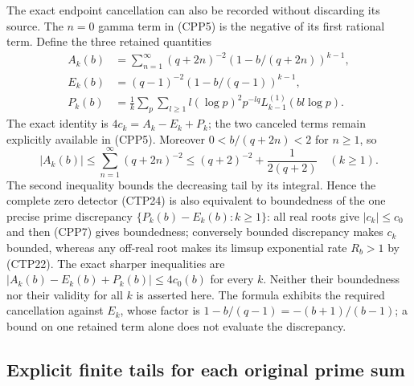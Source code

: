 The exact endpoint cancellation can also be recorded without
discarding its source. The $n=0$ gamma term in (CPP5) is the
negative of its first rational term. Define the three retained
quantities
\begin{equation}\tag{CPP6}
\begin{split}
 A_k(b)&=\sum_{n=1}^\infty(q+2n)^{-2}
                          (1-b/(q+2n))^{k-1},\\
 E_k(b)&=(q-1)^{-2}(1-b/(q-1))^{k-1},\\
 P_k(b)&=\frac1k\sum_p\sum_{l\ge1}
       l(\log p)^2p^{-lq}L_{k-1}^{(1)}(bl\log p).
\end{split}
\end{equation}
The exact identity is $4c_k=A_k-E_k+P_k$; the two canceled
terms remain explicitly available in (CPP5). Moreover
$0<b/(q+2n)<2$ for $n\ge1$, so
\begin{equation}\tag{CPP7}
 |A_k(b)|\le\sum_{n=1}^\infty(q+2n)^{-2}
     \le(q+2)^{-2}+\frac1{2(q+2)}\quad(k\ge1).
\end{equation}
The second inequality bounds the decreasing tail by its
integral. Hence the complete zero detector (CTP24) is also
equivalent to boundedness of the one precise prime discrepancy
$\{P_k(b)-E_k(b):k\ge1\}$: all real roots give
$|c_k|\le c_0$ and then (CPP7) gives boundedness; conversely
bounded discrepancy makes $c_k$ bounded, whereas any off-real
root makes its limsup exponential rate $R_b>1$ by (CTP22).
The exact sharper inequalities are
$|A_k(b)-E_k(b)+P_k(b)|\le4c_0(b)$ for every $k$.
Neither their boundedness nor their validity for all $k$ is
asserted here. The formula exhibits the required cancellation
against $E_k$, whose factor is
$1-b/(q-1)=-(b+1)/(b-1)$; a bound on one retained term alone
does not evaluate the discrepancy.

\subsection{Explicit finite tails for each original prime sum}

